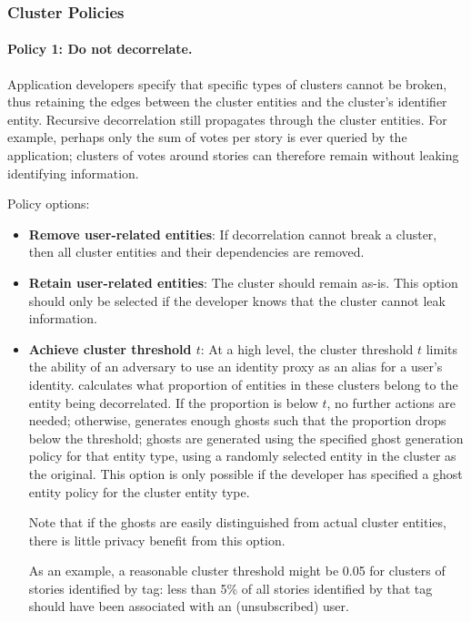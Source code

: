 \subsubsection{Cluster Policies}

\paragraph{Policy 1: Do not decorrelate.}

Application developers specify that specific types of clusters cannot be broken, thus retaining the edges between the cluster entities and the cluster's identifier entity.
Recursive decorrelation still propagates through the cluster entities. 
For example, perhaps only the sum of votes per story is ever queried by the application; clusters of
votes around stories can therefore remain without leaking identifying information.

\vspace{12pt}
\noindent Policy options:
\begin{itemize}
    \item \textbf{Remove user-related entities}: If decorrelation cannot break a cluster, then all
        cluster entities and their dependencies are removed.
    
    \item \textbf{Retain user-related entities}: The cluster should remain as-is. This option should
        only be selected if the developer knows that the cluster cannot leak information.

    \item \textbf{Achieve cluster threshold $t$}: At a high level, the cluster threshold
        $t$ limits the ability of an adversary to use an identity proxy as an alias for a user's
        identity.  \sys{} calculates what proportion of entities in these clusters belong to the
        entity being decorrelated. If the proportion is below $t$, no further actions are needed;
        otherwise, \sys{} generates enough ghosts such that the proportion drops below the
        threshold; ghosts are generated using the specified ghost generation policy for that entity
        type, using a randomly selected entity in the cluster as the original.
        This option is only possible if the developer has specified a ghost entity policy for the
        cluster entity type. 

        Note that if the ghosts are easily distinguished from actual cluster entities, there is
        little privacy benefit from this option.

        As an example, a reasonable cluster threshold might be 0.05 for clusters of stories identified by
        tag: less than 5\% of all stories identified by that tag should have been associated with an
        (unsubscribed) user. 
\end{itemize}

